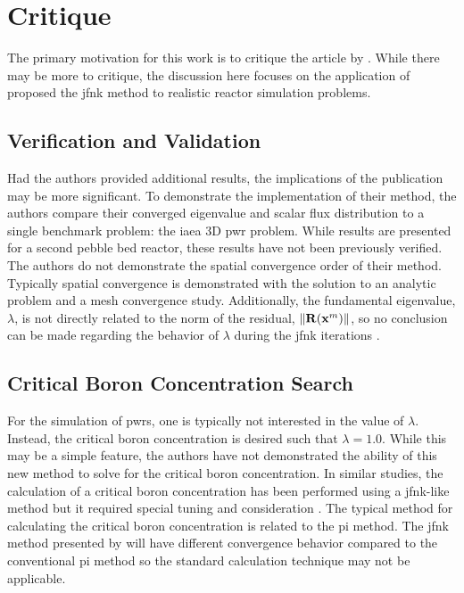 \section{Critique}
\label{sec:critique}

  The primary motivation for this work is to critique the article by
  \citeauthor{qe2paper}. While there may be more to critique, the discussion
  here focuses on the application of proposed the \gls{jfnk} method to realistic
  reactor simulation problems.

  \subsection{Verification and Validation}

    Had the authors provided additional results, the implications of the
    publication may be more significant. To demonstrate the implementation of
    their method, the authors compare their converged eigenvalue and scalar flux
    distribution to a single benchmark problem: the \gls{iaea} 3D \gls{pwr}
    problem. While results are presented for a second pebble bed reactor, these
    results have not been previously verified. The authors do not demonstrate
    the spatial convergence order of their method. Typically spatial convergence
    is demonstrated with the solution to an analytic problem and a mesh
    convergence study. Additionally, the fundamental eigenvalue, $\lambda$, is
    not directly related to the norm of the residual, $\| \mathbf{R} (\mathbf{x}^m) \|$,
    so no conclusion can be made regarding the behavior of $\lambda$ during the
    \gls{jfnk} iterations \cite{caslJFNK}.

  \subsection{Critical Boron Concentration Search}

    For the simulation of \glspl{pwr}, one is typically not interested in the
    value of $\lambda$. Instead, the critical boron concentration is desired
    such that $\lambda=1.0$. While this may be a simple feature, the authors
    have not demonstrated the ability of this new method to solve for the
    critical boron concentration. In similar studies, the calculation of a
    critical boron concentration has been performed using a \gls{jfnk}-like
    method but it required special tuning and consideration \cite{caslJFNK}. The
    typical method for calculating the critical boron concentration is related
    to the \gls{pi} method. The \gls{jfnk} method presented by
    \citeauthor{qe2paper} will have different convergence behavior compared to
    the conventional \gls{pi} method so the standard calculation technique may
    not be applicable.

